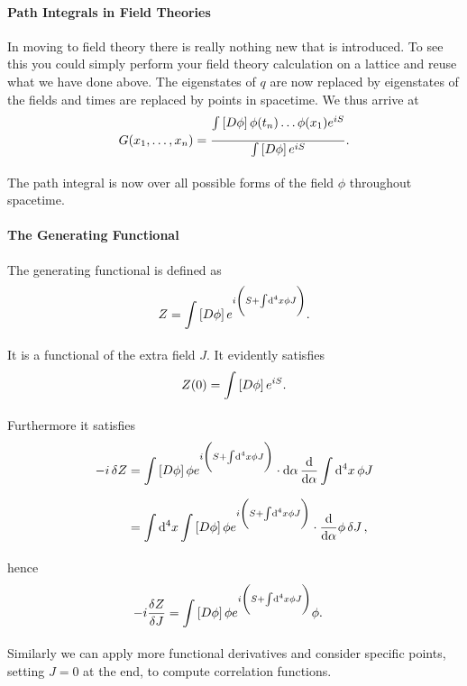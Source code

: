 \paragraph{Path Integrals in Field Theories}
In moving to field theory there is really nothing new that is introduced. To see this you could simply perform your field theory calculation on a lattice and reuse what we have done above. The eigenstates of $q$ are now replaced by eigenstates of the fields and times are replaced by points in spacetime. We thus arrive at
\begin{align*}
	G(x_{1}, \dots, x_{n}) = \frac{\int\limits_{}\left[D\phi\right]\phi(t_{n})\dots \phi(x_{1})e^{iS}}{\int\limits_{}\left[D\phi\right]e^{iS}}.
\end{align*}
The path integral is now over all possible forms of the field $\phi$ throughout spacetime.

\paragraph{The Generating Functional}
The generating functional is defined as
\begin{align*}
	Z = \int\limits_{}\left[D\phi\right]e^{i\left(S + \int\limits_{}^{}\dd[4]{x}\phi J\right)}.
\end{align*}
It is a functional of the extra field $J$. It evidently satisfies
\begin{align*}
	Z(0) = \int\limits_{}\left[D\phi\right]e^{iS}.
\end{align*}
Furthermore it satisfies
\begin{align*}
	-i\var{Z} &= \int\limits_{}\left[D\phi\right]\phi e^{i\left(S + \int\limits_{}^{}\dd[4]{x}\phi J\right)}\cdot\dd{\alpha}\dv{\alpha}\int\limits_{}^{}\dd[4]{x}\phi J \\
	          &= \int\limits_{}^{}\dd[4]{x}\int\limits_{}\left[D\phi\right]\phi e^{i\left(S + \int\limits_{}^{}\dd[4]{x}\phi J\right)}\cdot\dv{\alpha}\phi\var{J},
\end{align*}
hence
\begin{align*}
	-i\fdv{Z}{J} &= \pinte{}{\phi}\phi e^{i\left(S + \inte{}{}\dd[4]{x}\phi J\right)}\phi.
\end{align*}
Similarly we can apply more functional derivatives and consider specific points, setting $J = 0$ at the end, to compute correlation functions.

